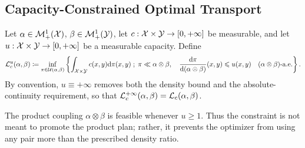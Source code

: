 \subsection{Capacity-Constrained Optimal Transport}
\label{sec-capacity-constrained-ot}
\begin{defn}\label{def-capacity-constrained-ot}
Let $\alpha\in\mathcal{M}_+^1(\mathcal{X})$, $\beta\in\mathcal{M}_+^1(\mathcal{Y})$, let $c:\mathcal{X}\times\mathcal{Y}\to[0,+\infty]$ be measurable, and let $u:\mathcal{X}\times\mathcal{Y}\to[0,+\infty]$ be a measurable capacity. Define
\begin{equation}\label{eq-capacity-constrained-ot}
\mathcal{L}_c^u(\alpha,\beta)
\coloneqq
\inf_{\pi\in\mathcal{U}(\alpha,\beta)}
\left\{ 
\int_{\mathcal{X}\times\mathcal{Y}} c(x,y)\mathrm{d}\pi(x,y)
 \;;\; 
\pi\ll\alpha\otimes\beta,\quad
\frac{\mathrm{d}\pi}{\mathrm{d}(\alpha\otimes\beta)}(x,y)\leqslant u(x,y)
\quad (\alpha\otimes\beta)\text{-a.e.}
 \right\}.
\end{equation}
By convention, $u\equiv+\infty$ removes both the density bound and the absolute-continuity requirement, so that $\mathcal{L}_c^{+\infty}(\alpha,\beta)=\mathcal{L}_c(\alpha,\beta)$.
\end{defn}
The product coupling $\alpha\otimes\beta$ is feasible whenever $u\geq1$. Thus the constraint is not meant to promote the product plan; rather, it prevents the optimizer from using any pair more than the prescribed density ratio.

